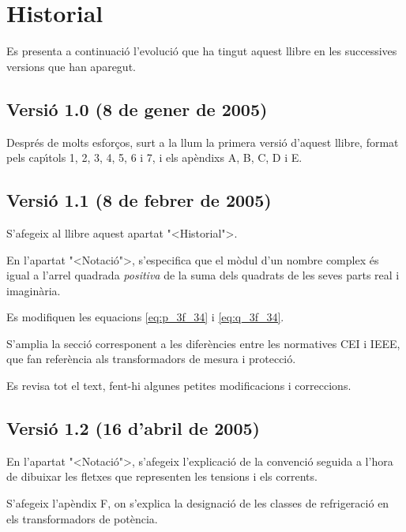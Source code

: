 \chapter*{Historial}

Es presenta a continuaci\'{o} l'evoluci\'{o} que ha tingut aquest llibre en
les successives versions que han aparegut.

\section*{Versi\'{o} 1.0 (8 de gener de 2005)}

Despr\'{e}s de molts esfor\c{c}os, surt a la llum la primera versi\'{o} d'aquest
llibre, format pels cap\'{\i}tols 1, 2, 3, 4, 5, 6 i 7, i els ap\`{e}ndixs A,
B, C, D i E.

\section*{Versi\'{o} 1.1 (8 de febrer de 2005)}

S'afegeix al llibre aquest apartat {"<}Historial{">}.

En l'apartat {"<}Notaci\'{o}{">}, s'especifica que el m\`{o}dul d'un nombre
complex \'{e}s igual a l'arrel quadrada \emph{positiva} de la suma dels
quadrats de les seves parts real i imagin\`{a}ria.

Es modifiquen les equacions \eqref{eq:p_3f_34} i \eqref{eq:q_3f_34}.

S'amplia la secci\'{o} corresponent a les difer\`{e}ncies entre les
normatives \textsf{CEI} i \textsf{IEEE}, que fan refer\`{e}ncia als
transformadors de mesura i protecci\'{o}.

Es revisa tot el text, fent-hi algunes petites modificacions i
correccions.

\section*{Versi\'{o} 1.2 (16 d'abril de 2005)}

En l'apartat {"<}Notaci\'{o}{">}, s'afegeix l'explicaci\'{o} de la convenci\'{o}
seguida a l'hora de dibuixar les fletxes que representen les
tensions i els corrents.

S'afegeix l'ap\`{e}ndix F, on s'explica la designaci\'{o} de les classes de
refrigeraci\'{o} en els transformadors de pot\`{e}ncia.

